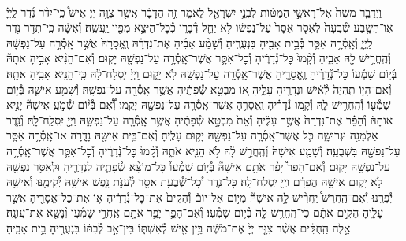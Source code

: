 \documentclass[twoside, openany, parskip=half, 11pt]{book}
\begin{document}
\begin{footnotesize}
\begin{multicols}{2}
\\
וַיְדַבֵּ֤ר מֹשֶׁה֙ אֶל־רָאשֵׁ֣י הַמַּטּ֔וֹת לִבְנֵ֥י יִשְׂרָאֵ֖ל לֵאמֹ֑ר זֶ֣ה הַדָּבָ֔ר אֲשֶׁ֖ר צִוָּ֥ה יְיָ׃ אִישׁ֩ כִּֽי־יִדֹּ֨ר נֶ֜דֶר לַֽיְיָ֗ אֽוֹ־הִשָּׁ֤בַע שְׁ֯בֻעָה֙ לֶאְסֹ֤ר אִסָּר֙ עַל־נַפְשׁ֔וֹ לֹ֥א יַחֵ֖ל דְּ֯בָר֑וֹ כְּ֯כׇל־הַיֹּצֵ֥א מִפִּ֖יו יַֽעֲשֶֽׂה׃ וְ֯אִשָּׁ֕ה כִּֽי־תִדֹּ֥ר נֶ֖דֶר לַֽיְיָ֑ וְ֯אָֽסְ֯רָ֥ה אִסָּ֛ר בְּ֯בֵ֥ית אָבִ֖יהָ בִּנְעֻרֶֽיהָ׃ וְ֯שָׁמַ֨ע אָבִ֜יהָ אֶת־נִדְרָ֗הּ וֶֽאֱסָרָהּ֙ אֲשֶׁ֣ר אָֽסְ֯רָ֣ה עַל־נַפְשָׁ֔הּ וְ֯הֶֽחֱרִ֥ישׁ לָ֖הּ אָבִ֑יהָ וְ֯קָ֨מוּ֙ כׇּל־נְ֯דָרֶ֔יהָ וְ֯כׇל־אִסָּ֛ר אֲשֶׁר־אָֽסְ֯רָ֥ה עַל־נַפְשָׁ֖הּ יָקֽוּם׃ וְ֯אִם־הֵנִ֨יא אָבִ֣יהָ אֹתָהּ֘ בְּ֯י֣וֹם שָׁמְ֯עוֹ֒ כׇּל־נְ֯דָרֶ֗יהָ וֶֽאֱסָרֶ֛יהָ אֲשֶׁר־אָֽסְ֯רָ֥ה עַל־נַפְשָׁ֖הּ לֹ֣א יָק֑וּם וַֽיְיָ֙ יִֽסְלַח־לָ֔הּ כִּֽי־הֵנִ֥יא אָבִ֖יהָ אֹתָֽהּ׃ וְ֯אִם־הָי֤וֹ תִֽהְיֶה֙ לְ֯אִ֔ישׁ וּנְדָרֶ֖יהָ עָלֶ֑יהָ א֚וֹ מִבְטָ֣א שְׂ֯פָתֶ֔יהָ אֲשֶׁ֥ר אָֽסְ֯רָ֖ה עַל־נַפְשָֽׁהּ׃ וְ֯שָׁמַ֥ע אִישָׁ֛הּ בְּ֯י֥וֹם שָׁמְ֯ע֖וֹ וְ֯הֶֽחֱרִ֣ישׁ לָ֑הּ וְ֯קָ֣מוּ נְ֯דָרֶ֗יהָ וֶֽאֱסָרֶ֛הָ אֲשֶׁר־אָֽסְ֯רָ֥ה עַל־נַפְשָׁ֖הּ יָקֻֽמוּ׃ וְ֠֯אִ֠ם בְּ֯י֨וֹם שְׁ֯מֹ֣עַֽ אִישָׁהּ֘ יָנִ֣יא אוֹתָהּ֒ וְ֯הֵפֵ֗ר אֶת־נִדְרָהּ֙ אֲשֶׁ֣ר עָלֶ֔יהָ וְ֯אֵת֙ מִבְטָ֣א שְׂ֯פָתֶ֔יהָ אֲשֶׁ֥ר אָֽסְ֯רָ֖ה עַל־נַפְשָׁ֑הּ וַֽיְיָ֖ יִֽסְלַֽח־לָֽהּ׃  וְ֯נֵ֥דֶר אַלְמָנָ֖ה וּגְרוּשָׁ֑ה כֹּ֛ל אֲשֶׁר־אָֽסְ֯רָ֥ה עַל־נַפְשָׁ֖הּ יָק֥וּם עָלֶֽיהָ׃ וְ֯אִם־בֵּ֥ית אִישָׁ֖הּ נָדָ֑רָה אוֹ־אָֽסְ֯רָ֥ה אִסָּ֛ר עַל־נַפְשָׁ֖הּ בִּשְׁבֻעָֽה׃ וְ֯שָׁמַ֤ע אִישָׁהּ֙ וְ֯הֶֽחֱרִ֣שׁ לָ֔הּ לֹ֥א הֵנִ֖יא אֹתָ֑הּ וְ֯קָ֨מוּ֙ כׇּל־נְ֯דָרֶ֔יהָ וְ֯כׇל־אִסָּ֛ר אֲשֶׁר־אָֽסְ֯רָ֥ה עַל־נַפְשָׁ֖הּ יָקֽוּם׃ וְ֯אִם־הָפֵר֩ יָפֵ֨ר אֹתָ֥ם אִישָׁהּ֘ בְּ֯י֣וֹם שָׁמְ֯עוֹ֒ כׇּל־מוֹצָ֨א שְׂ֯פָתֶ֧יהָ לִנְדָרֶ֛יהָ וּלְאִסַּ֥ר נַפְשָׁ֖הּ לֹ֣א יָק֑וּם אִישָׁ֣הּ הֲפֵרָ֔ם וַֽיְיָ֖ יִֽסְלַֽח־לָֽהּ׃  כׇּל־נֵ֛דֶר וְ֯כׇל־שְׁ֯בֻעַ֥ת אִסָּ֖ר לְ֯עַנֹּ֣ת נָ֑פֶשׁ אִישָׁ֥הּ יְ֯קִימֶ֖נּוּ וְ֯אִישָׁ֥הּ יְ֯פֵרֶֽנּוּ׃ וְ֯אִם־הַֽחֲרֵשׁ֩ יַֽחֲרִ֨ישׁ לָ֥הּ אִישָׁהּ֘ מִיּ֣וֹם אֶל־יוֹם֒ וְ֯הֵקִים֙ אֶת־כׇּל־נְ֯דָרֶ֔יהָ א֥וֹ אֶת־כׇּל־אֱסָרֶ֖יהָ אֲשֶׁ֣ר עָלֶ֑יהָ הֵקִ֣ים אֹתָ֔ם כִּי־הֶֽחֱרִ֥שׁ לָ֖הּ בְּ֯י֥וֹם שָׁמְ֯עֽוֹ׃ וְ֯אִם־הָפֵ֥ר יָפֵ֛ר אֹתָ֖ם אַֽחֲרֵ֣י שָׁמְ֯ע֑וֹ וְ֯נָשָׂ֖א אֶת־עֲוֹנָֽהּ׃ אֵ֣לֶּה הַֽחֻקִּ֗ים אֲשֶׁ֨ר צִוָּ֤ה יְיָ֙ אֶת־מֹשֶׁ֔ה בֵּ֥ין אִ֖ישׁ לְ֯אִשְׁתּ֑וֹ בֵּין־אָ֣ב לְ֯בִתּ֔וֹ בִּנְעֻרֶ֖יהָ בֵּ֥ית אָבִֽיהָ׃


\end{multicols}
\end{footnotesize}
\end{document}
